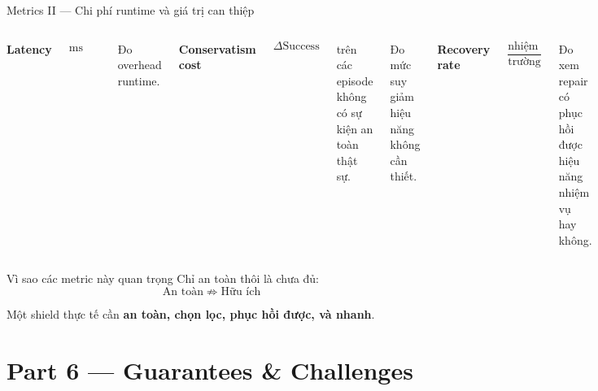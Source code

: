 \documentclass[aspectratio=169]{beamer}
\begin{document}
\begin{frame}[t,shrink=8]{Metrics II --- Chi phí runtime và giá trị can thiệp}

\begin{columns}[T]


\textbf{Latency}

\[
\text{ms tăng thêm (trung vị) / quyết định}
\]

Đo overhead runtime.


\textbf{Conservatism cost}

\[
\Delta\text{Success}
\]

trên các episode không có sự kiện an toàn thật sự.

Đo mức suy giảm hiệu năng không cần thiết.


\textbf{Recovery rate}

\[
\frac{
\text{nhiệm vụ thành công sau can thiệp}
}{
\text{trường hợp chunk bị reject}
}
\]

Đo xem repair có phục hồi được hiệu năng nhiệm vụ hay không.

\end{columns}

\vspace{10pt}

\begin{alertblock}{Vì sao các metric này quan trọng}
Chỉ an toàn thôi là chưa đủ:
\[
\boxed{
\text{An toàn}
\;\not\Rightarrow\;
\text{Hữu ích}
}
\]

Một shield thực tế cần \textbf{an toàn, chọn lọc, phục hồi được, và nhanh}.
\end{alertblock}

\end{frame}

\section{Part 6 --- Guarantees \& Challenges}
\end{document}
